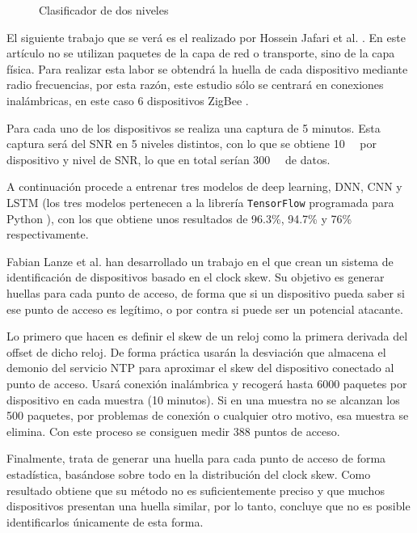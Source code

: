 \begin{figure}[htpb!]
    \centering
    \resizebox{0.6\textwidth}{!}{
        
    }
    \caption{Clasificador de dos niveles \cite{aksoy2019automated}}
    \label{fig:askoy_classifier}
\end{figure}

El siguiente trabajo que se verá es el realizado por Hossein Jafari et al. \cite{jafari2018iot}. En este artículo no se utilizan paquetes de la capa de red o transporte, sino de la capa física. Para realizar esta labor se obtendrá la huella de cada dispositivo mediante radio frecuencias, por esta razón, este estudio sólo se centrará en conexiones inalámbricas, en este caso 6 dispositivos ZigBee \cite{gislason2008zigbee}.

Para cada uno de los dispositivos se realiza una captura de 5 minutos. Esta captura será del SNR en 5 niveles distintos, con lo que se obtiene \SI{10}{\giga\byte} por dispositivo y nivel de SNR, lo que en total serían \SI{300}{\giga\byte} de datos.

A continuación procede a entrenar tres modelos de deep learning, DNN, CNN y LSTM (los tres modelos pertenecen a la librería \texttt{TensorFlow} programada para Python \cite{tensorflow2015-whitepaper}), con los que obtiene unos resultados de 96.3\%, 94.7\% y 76\% respectivamente.

Fabian Lanze et al. \cite{lanze2012clock} han desarrollado un trabajo en el que crean un sistema de identificación de dispositivos basado en el clock skew. Su objetivo es generar huellas para cada punto de acceso, de forma que si un dispositivo pueda saber si ese punto de acceso es legítimo, o por contra si puede ser un potencial atacante.

Lo primero que hacen es definir el skew de un reloj como la primera derivada del offset de dicho reloj. De forma práctica usarán la desviación que almacena el demonio del servicio NTP para aproximar el skew del dispositivo conectado al punto de acceso. Usará conexión inalámbrica y recogerá hasta 6000 paquetes por dispositivo en cada muestra (10 minutos). Si en una muestra no se alcanzan los 500 paquetes, por problemas de conexión o cualquier otro motivo, esa muestra se elimina. Con este proceso se consiguen medir 388 puntos de acceso. 

Finalmente, trata de generar una huella para cada punto de acceso de forma estadística, basándose sobre todo en la distribución del clock skew. Como resultado obtiene que su método no es suficientemente preciso y que muchos dispositivos presentan una huella similar, por lo tanto, concluye que no es posible identificarlos únicamente de esta forma.

